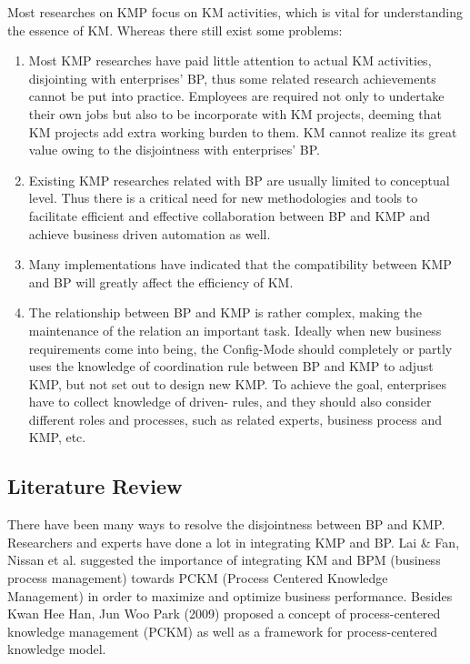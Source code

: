 \documentclass{elsarticle}
\begin{document}
Most researches on KMP focus on KM activities, which is vital
for understanding the essence of KM. Whereas there still exist some
problems:
\begin{enumerate}
\item Most KMP researches have paid little attention to actual KM
activities, disjointing with enterprises' BP, thus
some related research achievements cannot be put into practice.
Employees are required not only to undertake their own jobs but also to
be incorporate with KM projects, deeming that KM projects add
extra working burden to them. KM cannot realize its great value owing
to the disjointness with enterprises' BP.
\item   Existing KMP researches related with BP are usually limited
to conceptual level. Thus there is a critical need for new
methodologies and tools to facilitate efficient and effective
collaboration between BP and KMP and achieve business driven automation
as well.
\item  Many implementations have indicated that the compatibility
between KMP and BP will greatly affect the efficiency of KM.
\item The relationship between BP and KMP is rather complex, making
the maintenance of the relation an important task. Ideally when new
business requirements come into being, the Config-Mode should
completely or partly uses the knowledge of
coordination rule between BP and KMP to adjust KMP, but not
set out to design new KMP. To achieve the goal, enterprises have to
collect knowledge of driven- rules, and they should also consider
different roles and processes, such as related experts, business
process and KMP, etc\cite{yang2009product}.
\end{enumerate}


\subsection{Literature Review}
\label{sec:literature-review}



\textrm{There have been many ways to resolve the disjointness between BP
and KMP. Researchers and experts have done a lot in integrating KMP and
BP. }\textrm{Lai \& Fan, Nissan et al. suggested the importance of
}\textrm{{integrating}}\textrm{ KM and BPM (business
process management) towards PCKM (Process Centered Knowledge
Management) in order to maximize and optimize business
performance}\cite{lai2002workflow,nissen2000toward}. \textrm{{Besides }}\textrm{Kwan Hee Han, Jun Woo Park
(2009) proposed a concept of process-centered knowledge management
(PCKM) as well as a framework for}\textrm{{
}}\textrm{process-centered knowledge
model}\textrm{.}\textrm{\textcolor[rgb]{0.5019608,0.0,0.0}{
}}
\end{document}
